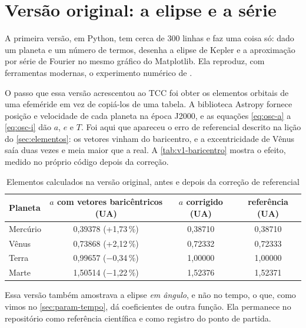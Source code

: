 \section{Versão original: a elipse e a série}\label{sec:v-original}

A primeira versão, em Python, tem cerca de 300 linhas e faz uma coisa só: dado um planeta e um número de termos, desenha a elipse de Kepler e a aproximação por série de Fourier no mesmo gráfico do Matplotlib. Ela reproduz, com ferramentas modernas, o experimento numérico de .

O passo que essa versão acrescentou ao TCC foi obter os elementos orbitais de uma efeméride em vez de copiá-los de uma tabela. A biblioteca Astropy \cite{astropy2022} fornece posição e velocidade de cada planeta na época J2000, e as equações \eqref{eq:osc-a} a \eqref{eq:osc-i} dão $a$, $e$ e $T$. Foi aqui que apareceu o erro de referencial descrito na lição do \autoref{sec:elementos}: os vetores vinham do baricentro, e a excentricidade de Vênus saía duas vezes e meia maior que a real. A \autoref{tab:v1-baricentro} mostra o efeito, medido no próprio código depois da correção.

\begin{table}[htb]
  \centering
  \caption{Elementos calculados na versão original, antes e depois da correção de referencial}
  \label{tab:v1-baricentro}
  \begin{tabular}{lccc}
    \toprule
    Planeta & $a$ com vetores baricêntricos (UA) & $a$ corrigido (UA) & referência (UA) \\
    \midrule
    Mercúrio & 0,39378 \;(+1,73\,\%) & 0,38710 & 0,38710 \\
    Vênus    & 0,73868 \;(+2,12\,\%) & 0,72332 & 0,72333 \\
    Terra    & 0,99657 \;($-$0,34\,\%) & 1,00000 & 1,00000 \\
    Marte    & 1,50514 \;($-$1,22\,\%) & 1,52376 & 1,52371 \\
    \bottomrule
  \end{tabular}
\end{table}

Essa versão também amostrava a elipse \emph{em ângulo}, e não no tempo, o que, como vimos no \autoref{sec:param-tempo}, dá coeficientes de outra função. Ela permanece no repositório como referência científica e como registro do ponto de partida.

